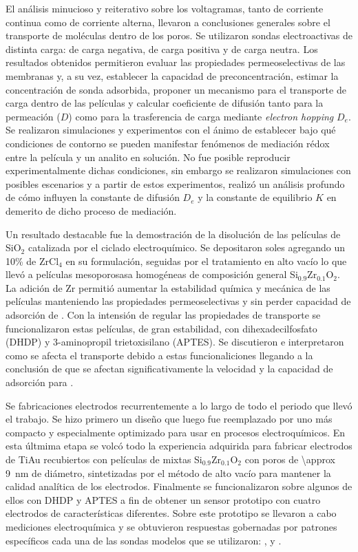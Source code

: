 El análisis minucioso y reiterativo sobre los voltagramas, tanto de corriente continua como de corriente alterna, llevaron a conclusiones generales sobre el transporte de moléculas dentro de los poros. Se utilizaron sondas electroactivas de distinta carga: \ferroferri\space de carga negativa, \aminorutenio\space de carga positiva y \ferroceno\space de carga neutra. Los resultados obtenidos permitieron evaluar las propiedades permeoselectivas de las membranas y, a su vez, establecer la capacidad de preconcentración, estimar la concentración de sonda adsorbida, proponer un mecanismo para el transporte de carga dentro de las películas y calcular coeficiente de difusión tanto para la permeación ($D$) como para la trasferencia de carga mediante \textit{electron hopping} $D_e$.
 Se realizaron simulaciones y experimentos con el ánimo de establecer bajo qué condiciones de contorno se pueden manifestar fenómenos de mediación rédox entre la película y un analito en solución. No fue posible reproducir experimentalmente dichas condiciones, sin embargo se realizaron simulaciones con posibles escenarios y a partir de estos experimentos, realizó un análisis profundo de cómo influyen la constante de difusión $D_e$ y la constante de equilibrio $K$ en demerito de dicho proceso de mediación. 

Un resultado destacable fue la demostración de la disolución de las películas de SiO$_2$ catalizada por el ciclado electroquímico. Se depositaron soles agregando un 10\% de  ZrCl$_4$ en su formulación, seguidas por el tratamiento en alto vacío lo que llevó a películas mesoporosasa homogéneas de composición general Si$_{0.9}$Zr$_{0.1}$O$_2$. La adición de Zr permitió aumentar la estabilidad química y mecánica de las películas manteniendo las propiedades permeoselectivas y sin perder capacidad de adsorción de \aminorutenio. Con la intensión de regular las propiedades de transporte se funcionalizaron estas películas, de gran estabilidad, con dihexadecilfosfato (DHDP) y 3-aminopropil trietoxisilano (APTES). Se discutieron e interpretaron como se afecta el transporte debido a estas funcionaliciones llegando a la conclusión de que se afectan significativamente la velocidad y la capacidad de adsorción para \ru.

Se fabricaciones electrodos recurrentemente a lo largo de todo el periodo que llevó el trabajo. Se hizo primero un diseño que luego fue reemplazado por uno más compacto y especialmente optimizado para usar en procesos electroquímicos. En esta últmima etapa se volcó todo la experiencia adquirida para fabricar electrodos de Ti\textbar Au recubiertos con películas de mixtas Si$_{0.9}$Zr$_{0.1}$O$_2$ con poros de \SI{\approx 9}{\nm} de diámetro, sintetizadas por el método de alto vacío para mantener la calidad analítica de los electrodos. Finalmente se funcionalizaron sobre algunos de ellos con DHDP y APTES a fin de obtener un sensor prototipo con cuatro electrodos de características diferentes. Sobre este prototipo se llevaron a cabo mediciones electroquímica y se obtuvieron respuestas gobernadas por patrones específicos cada una de las sondas modelos que se utilizaron: \ferroferri, \ferroceno\space y \aminorutenio.   



